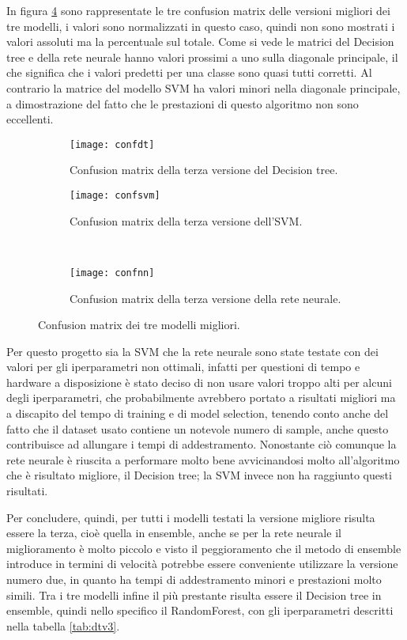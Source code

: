 In figura \ref{fig:conf} sono rappresentate le tre confusion matrix delle versioni migliori dei tre modelli, i valori sono normalizzati in questo caso, quindi non sono mostrati i valori assoluti ma la percentuale sul totale. Come si vede le matrici del Decision tree e della rete neurale hanno valori prossimi a uno sulla diagonale principale, il che significa che i valori predetti per una classe sono quasi tutti corretti. Al contrario la matrice del modello SVM ha valori minori nella diagonale principale, a dimostrazione del fatto che le prestazioni di questo algoritmo non sono eccellenti. 

\begin{figure}[h]
    \centering
    \begin{subfigure}[t]{0.4\textwidth}
        \centering\texttt{[image: confdt]}
        \caption{Confusion matrix della terza versione del Decision tree.}
        \label{fig:conf:dt}
    \end{subfigure}
    \begin{subfigure}[t]{0.4\textwidth}
        \centering\texttt{[image: confsvm]}
        \caption{Confusion matrix della terza versione dell'SVM.}
        \label{fig:conf:svm}
    \end{subfigure}
    \\
    \begin{subfigure}[t]{0.4\textwidth}
        \centering\texttt{[image: confnn]}
        \caption{Confusion matrix della terza versione della rete neurale.}
        \label{fig:conf:nn}
    \end{subfigure}
    \caption{Confusion matrix dei tre modelli migliori.}
    \label{fig:conf}
\end{figure}

Per questo progetto sia la SVM che la rete neurale sono state testate con dei valori per gli iperparametri non ottimali, infatti per questioni di tempo e hardware a disposizione è stato deciso di non usare valori troppo alti per alcuni degli iperparametri, che probabilmente avrebbero portato a risultati migliori ma a discapito del tempo di training e di model selection, tenendo conto anche del fatto che il dataset usato contiene un notevole numero di sample, anche questo contribuisce ad allungare i tempi di addestramento. Nonostante ciò comunque la rete neurale è riuscita a performare molto bene avvicinandosi molto all'algoritmo che è risultato migliore, il Decision tree; la SVM invece non ha raggiunto questi risultati.

Per concludere, quindi, per tutti i modelli testati la versione migliore risulta essere la terza, cioè quella in ensemble, anche se per la rete neurale il miglioramento è molto piccolo e visto il peggioramento che il metodo di ensemble introduce in termini di velocità potrebbe essere conveniente utilizzare la versione numero due, in quanto ha tempi di addestramento minori e prestazioni molto simili. Tra i tre modelli infine il più prestante risulta essere il Decision tree in ensemble, quindi nello specifico il RandomForest, con gli iperparametri descritti nella tabella \ref{tab:dtv3}.
